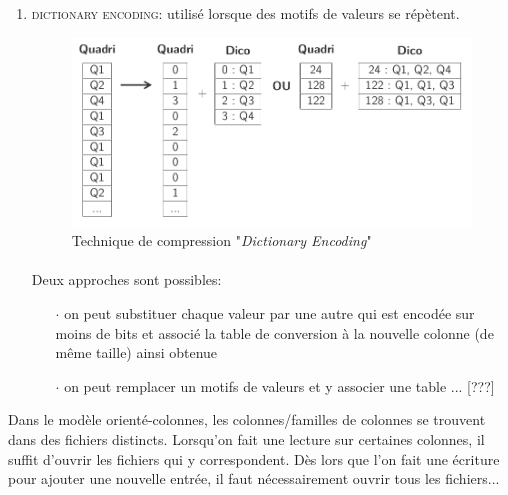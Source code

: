 {\begin{enumerate}
\item \textcolor{ltred}{\textsc{dictionary encoding}}: utilisé lorsque des motifs de valeurs se répètent.
	\begin{figure}[h!]
	\center \includegraphics[scale=.35]{images/colonnes-compression-dico}
	\caption{Technique de compression "\textit{Dictionary Encoding}" \cite{ref1}}\label{compression-dico}
	\end{figure}
\paragraph{}
Deux approches sont possibles:
	\begin{itemize}
	\item[$\cdot$]on peut substituer chaque valeur par une autre qui est encodée sur moins de bits et associé la table de conversion à la nouvelle colonne (de même taille) ainsi obtenue
	\item[$\cdot$]on peut remplacer un motifs de valeurs et y associer une table ... [???]
	\end{itemize}
\end{enumerate}
}


\item{}
{\faux}
{Dans le modèle orienté-colonnes, les colonnes/familles de colonnes se trouvent dans des fichiers distincts. Lorsqu'on fait une lecture sur certaines colonnes, il suffit d'ouvrir les fichiers qui y correspondent. Dès lors que l'on fait une écriture pour ajouter une nouvelle entrée, il faut nécessairement ouvrir tous les fichiers... }

 
\item{}
{\vrai}
{}


